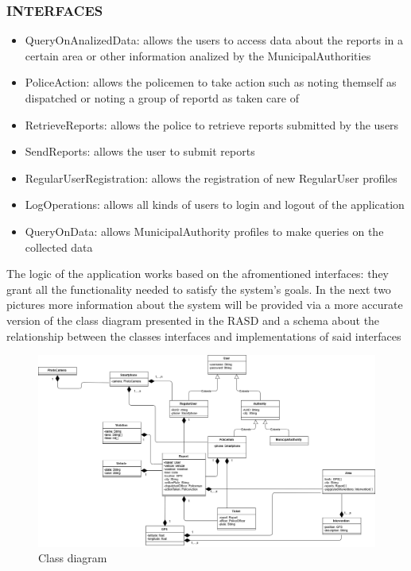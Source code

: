 \subsubsection{INTERFACES}
\begin{itemize}
\item QueryOnAnalizedData: allows the users to access data about the reports in a certain area or other information analized by the MunicipalAuthorities
\item PoliceAction: allows the policemen to take action such as noting themself as dispatched or noting a group of reportd as taken care of
\item RetrieveReports: allows the police to retrieve reports submitted by the users
\item SendReports: allows the user to submit reports
\item RegularUserRegistration: allows the registration of new RegularUser profiles
\item LogOperations: allows all kinds of users to login and logout of the application
\item QueryOnData: allows MunicipalAuthority profiles to make queries on the collected data
\end{itemize}
The logic of the application works based on the afromentioned interfaces: they grant all the functionality needed to satisfy the system's goals.
In the next two pictures more information about the system will be provided via a more accurate version of the class diagram presented in the RASD and a schema about the relationship between the classes interfaces and implementations of said interfaces
\newpage
\begin{figure}[h!]
	\centering
	\includegraphics[angle=90, scale=0.45]{Images/ADV_class_diagram}
	\caption{Class diagram}
\end{figure}
\newpage

